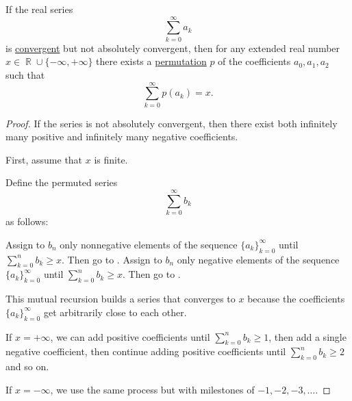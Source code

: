 \begin{theorem}\label{thm:riemanns_series_permutation_theorem}\mcite\cite[]{Фихтенгольц1968/2}
  If the real series
  \begin{equation*}
    \sum_{k=0}^\infty a_k
  \end{equation*}
  is \hyperref[def:convergent_series]{convergent} but not absolutely convergent, then for any extended real number \( x \in \BbbR \cup \{ -\infty, +\infty \} \) there exists a \hyperref[def:symmetric_group]{permutation} \( p \) of the coefficients \( a_0, a_1, a_2 \)
  such that
  \begin{equation*}
    \sum_{k=0}^\infty p(a_k) = x.
  \end{equation*}
\end{theorem}
\begin{proof}
  If the series is not absolutely convergent, then there exist both infinitely many positive and infinitely many negative coefficients.

  First, assume that \( x \) is finite.

  Define the permuted series
  \begin{equation*}
    \sum_{k=0}^\infty b_k
  \end{equation*}
  as follows:
  \begin{thmenum}
     Assign to \( b_n \) only nonnegative elements of the sequence \( \{ a_k \}_{k=0}^\infty \) until \( \sum_{k=0}^n b_k \geq x \). Then go to .
     Assign to \( b_n \) only negative elements of the sequence \( \{ a_k \}_{k=0}^\infty \) until \( \sum_{k=0}^n b_k \geq x \). Then go to .
  \end{thmenum}

  This mutual recursion builds a series that converges to \( x \) because the coefficients \( \{ a_k \}_{k=0}^\infty \) get arbitrarily close to each other.

  If \( x = +\infty \), we can add positive coefficients until \( \sum_{k=0}^n b_k \geq 1 \), then add a single negative coefficient, then continue adding positive coefficients until \( \sum_{k=0}^n b_k \geq 2 \) and so on.

  If \( x = -\infty \), we use the same process but with milestones of \( -1, -2, -3, \ldots \).
\end{proof}

